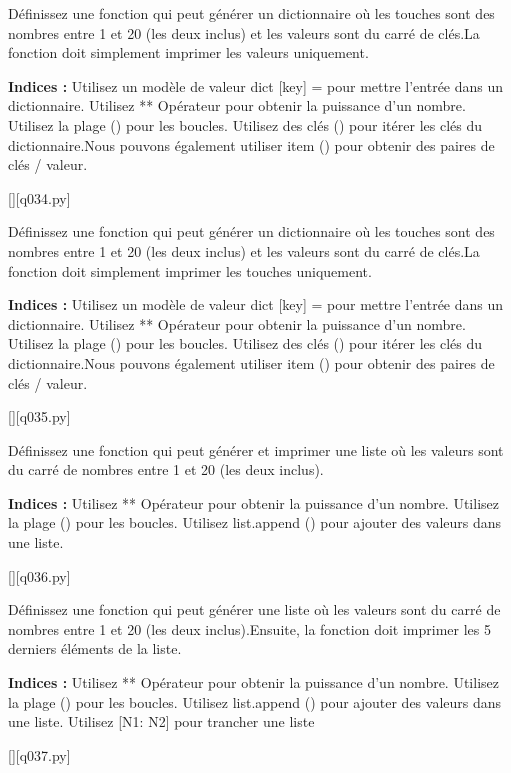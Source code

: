 \question
Définissez une fonction qui peut générer un dictionnaire où les touches sont des nombres entre 1 et 20 (les deux inclus) et les valeurs sont du carré de clés.La fonction doit simplement imprimer les valeurs uniquement.
\par
\textbf{Indices : }Utilisez un modèle de valeur dict [key] = pour mettre l'entrée dans un dictionnaire.
Utilisez ** Opérateur pour obtenir la puissance d'un nombre.
Utilisez la plage () pour les boucles.
Utilisez des clés () pour itérer les clés du dictionnaire.Nous pouvons également utiliser item () pour obtenir des paires de clés / valeur.
\renewcommand{\nomfichier}{q034.py}
\begin{solution}
    \pythonfile{\chemincode \nomfichier}[][q034.py]
\end{solution}


\question
Définissez une fonction qui peut générer un dictionnaire où les touches sont des nombres entre 1 et 20 (les deux inclus) et les valeurs sont du carré de clés.La fonction doit simplement imprimer les touches uniquement.
\par
\textbf{Indices : }Utilisez un modèle de valeur dict [key] = pour mettre l'entrée dans un dictionnaire.
Utilisez ** Opérateur pour obtenir la puissance d'un nombre.
Utilisez la plage () pour les boucles.
Utilisez des clés () pour itérer les clés du dictionnaire.Nous pouvons également utiliser item () pour obtenir des paires de clés / valeur.
\renewcommand{\nomfichier}{q035.py}
\begin{solution}
    \pythonfile{\chemincode \nomfichier}[][q035.py]
\end{solution}


\question
Définissez une fonction qui peut générer et imprimer une liste où les valeurs sont du carré de nombres entre 1 et 20 (les deux inclus).
\par
\textbf{Indices : }Utilisez ** Opérateur pour obtenir la puissance d'un nombre.
Utilisez la plage () pour les boucles.
Utilisez list.append () pour ajouter des valeurs dans une liste.
\renewcommand{\nomfichier}{q036.py}
\begin{solution}
    \pythonfile{\chemincode \nomfichier}[][q036.py]
\end{solution}


\question
Définissez une fonction qui peut générer une liste où les valeurs sont du carré de nombres entre 1 et 20 (les deux inclus).Ensuite, la fonction doit imprimer les 5 derniers éléments de la liste.
\par
\textbf{Indices : }Utilisez ** Opérateur pour obtenir la puissance d'un nombre.
Utilisez la plage () pour les boucles.
Utilisez list.append () pour ajouter des valeurs dans une liste.
Utilisez [N1: N2] pour trancher une liste
\renewcommand{\nomfichier}{q037.py}
\begin{solution}
    \pythonfile{\chemincode \nomfichier}[][q037.py]
\end{solution}


